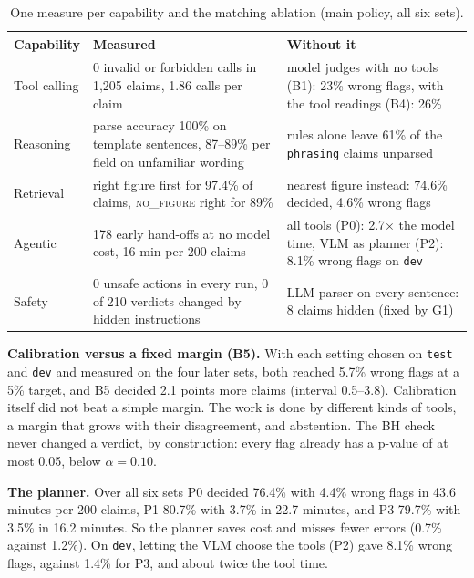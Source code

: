 \documentclass[11pt,a4paper]{article}
\newcommand{\code}[1]{\texttt{\small #1}}
\begin{document}
\begin{table}[H]
\centering\small\setlength{\tabcolsep}{5pt}
\begin{tabularx}{\textwidth}{@{}P{0.13}P{0.42}Y@{}}
\toprule
\textbf{Capability} & \textbf{Measured} & \textbf{Without it}\\
\midrule
Tool calling & 0 invalid or forbidden calls in 1{,}205 claims, 1.86 calls per claim & model judges with no tools (B1): 23\% wrong flags, with the tool readings (B4): 26\%\\
Reasoning & parse accuracy 100\% on template sentences, 87--89\% per field on unfamiliar wording & rules alone leave 61\% of the \code{phrasing} claims unparsed\\
Retrieval & right figure first for 97.4\% of claims, \textsc{no\_figure} right for 89\% & nearest figure instead: 74.6\% decided, 4.6\% wrong flags\\
Agentic & 178 early hand-offs at no model cost, 16 min per 200 claims & all tools (P0): 2.7$\times$ the model time, VLM as planner (P2): 8.1\% wrong flags on \code{dev}\\
Safety & 0 unsafe actions in every run, 0 of 210 verdicts changed by hidden instructions & LLM parser on every sentence: 8 claims hidden (fixed by G1)\\
\bottomrule
\end{tabularx}
\caption{One measure per capability and the matching ablation (main policy, all six sets).}
\label{tab:capabilities}
\end{table}

\textbf{Calibration versus a fixed margin (B5).} With each setting chosen on \code{test} and \code{dev} and measured on the four later sets, both reached 5.7\% wrong flags at a 5\% target, and B5 decided 2.1 points more claims (interval 0.5--3.8). Calibration itself did not beat a simple margin. The work is done by different kinds of tools, a margin that grows with their disagreement, and abstention. The BH check never changed a verdict, by construction: every flag already has a p-value of at most 0.05, below $\alpha = 0.10$.

\textbf{The planner.} Over all six sets P0 decided 76.4\% with 4.4\% wrong flags in 43.6 minutes per 200 claims, P1 80.7\% with 3.7\% in 22.7 minutes, and P3 79.7\% with 3.5\% in 16.2 minutes. So the planner saves cost and misses fewer errors (0.7\% against 1.2\%). On \code{dev}, letting the VLM choose the tools (P2) gave 8.1\% wrong flags, against 1.4\% for P3, and about twice the tool time.
\end{document}
